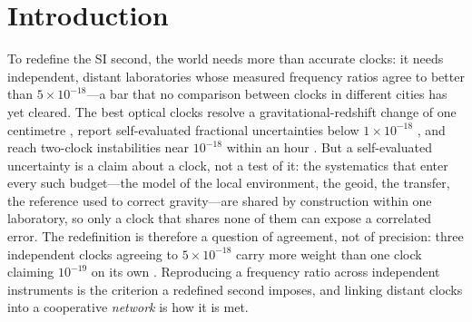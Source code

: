 \documentclass[11pt,a4paper]{article}
\begin{document}

\section{Introduction}
To redefine the SI second, the world needs more than accurate clocks: it
needs independent, distant laboratories whose measured frequency ratios
agree to better than $5\times10^{-18}$---a bar that no comparison between
clocks in different cities has yet cleared. The best optical clocks
resolve a gravitational-redshift change of one centimetre
\citep{mcgrew2018geodesy}, report self-evaluated fractional uncertainties
below $1\times10^{-18}$ \citep{arnold2026lu, zhang2026ca}, and reach
two-clock instabilities near $10^{-18}$ within an hour
\citep{oelker2019stability}. But a self-evaluated uncertainty is a claim
about a clock, not a test of it: the systematics that enter every such
budget---the model of the local environment, the geoid, the transfer,
the reference used to correct gravity---are shared by construction within
one laboratory, so only a clock that shares none of them can expose a
correlated error. The redefinition is therefore a question of agreement,
not of precision: three independent clocks agreeing to $5\times10^{-18}$
carry more weight than one clock claiming $10^{-19}$ on its own
\citep{dimarcq2024roadmap}. Reproducing a frequency ratio across
independent instruments is the criterion a redefined second imposes, and
linking distant clocks into a cooperative \emph{network}
\citep{riehle2017networks, komar2014quantumnetwork} is how it is met.
\end{document}

